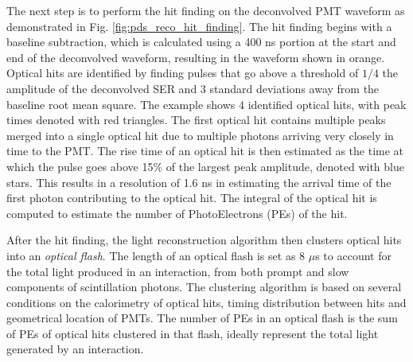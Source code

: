The next step is to perform the hit finding on the deconvolved PMT waveform as demonstrated in Fig. \ref{fig:pds_reco_hit_finding}.
The hit finding begins with a baseline subtraction, which is calculated using a 400 ns portion at the start and end of the deconvolved waveform, resulting in the waveform shown in orange.
Optical hits are identified by finding pulses that go above a threshold of $1/4$ the amplitude of the deconvolved SER and 3 standard deviations away from the baseline root mean square.
The example shows 4 identified optical hits, with peak times denoted with red triangles.
The first optical hit contains multiple peaks merged into a single optical hit due to multiple photons arriving very closely in time to the PMT.
The rise time of an optical hit is then estimated as the time at which the pulse goes above 15\% of the largest peak amplitude, denoted with blue stars.
This results in a resolution of 1.6 ns in estimating the arrival time of the first photon contributing to the optical hit.
The integral of the optical hit is computed to estimate the number of PhotoElectrons (PEs) of the hit.

After the hit finding, the light reconstruction algorithm then clusters optical hits into an \textit{optical flash}.                                                                                            
The length of an optical flash is set as 8 $\mu$s to account for the total light produced in an interaction, from both prompt and slow components of scintillation photons.
The clustering algorithm is based on several conditions on the calorimetry of optical hits, timing distribution between hits and geometrical location of PMTs.                                                  
The number of PEs in an optical flash is the sum of PEs of optical hits clustered in that flash, ideally
 represent the total light generated by an interaction. 

